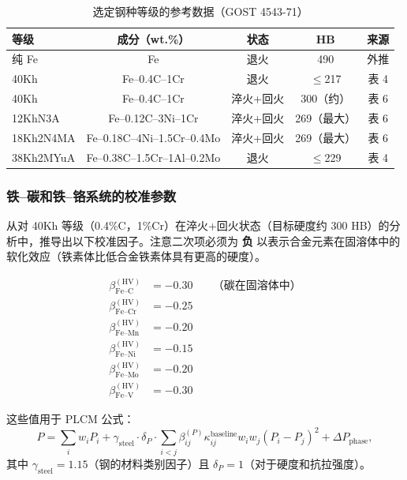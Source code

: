 \documentclass[12pt,a4paper]{article}
\begin{document}
	\begin{table}[htbp]
		\centering
		\caption{选定钢种等级的参考数据（GOST 4543-71）}
		\label{tab:steel_gost4543}
		\begin{tabular}{lcccc}
			\toprule
			\textbf{等级} & \textbf{成分（wt.\%）} & \textbf{状态} & \textbf{HB} & \textbf{来源} \\
			\midrule
			纯 Fe & Fe & 退火 & 490 & 外推 \\
			40Kh & Fe–0.4C–1Cr & 退火 & $\le$217 & 表 4 \\
			40Kh & Fe–0.4C–1Cr & 淬火+回火 & 300（约） & 表 6 \\
			12KhN3A & Fe–0.12C–3Ni–1Cr & 淬火+回火 & 269（最大） & 表 6 \\
			18Kh2N4MA & Fe–0.18C–4Ni–1.5Cr–0.4Mo & 淬火+回火 & 269（最大） & 表 6 \\
			38Kh2MYuA & Fe–0.38C–1.5Cr–1Al–0.2Mo & 退火 & $\le$229 & 表 4 \\
			\bottomrule
		\end{tabular}
	\end{table}
	
	\subsubsection{铁–碳和铁–铬系统的校准参数}
	从对 40Kh 等级（0.4\%C，1\%Cr）在淬火+回火状态（目标硬度约 300 HB）的分析中，推导出以下校准因子。注意二次项必须为 \textbf{负} 以表示合金元素在固溶体中的软化效应（铁素体比低合金铁素体具有更高的硬度）。
	
	\[
	\begin{aligned}
		\beta_{\text{Fe–C}}^{(\text{HV})} &= -0.30 \quad &\text{（碳在固溶体中）} \\
		\beta_{\text{Fe–Cr}}^{(\text{HV})} &= -0.25 \\
		\beta_{\text{Fe–Mn}}^{(\text{HV})} &= -0.20 \\
		\beta_{\text{Fe–Ni}}^{(\text{HV})} &= -0.15 \\
		\beta_{\text{Fe–Mo}}^{(\text{HV})} &= -0.20 \\
		\beta_{\text{Fe–V}}^{(\text{HV})} &= -0.30
	\end{aligned}
	\]
	
	这些值用于 PLCM 公式：
	\[
	P = \sum_i w_i P_i + \gamma_{\text{steel}} \cdot \delta_P \cdot \sum_{i<j} \beta_{ij}^{(P)} \kappa_{ij}^{\text{baseline}} w_i w_j (P_i - P_j)^2 + \Delta P_{\text{phase}},
	\]
	其中 $\gamma_{\text{steel}} = 1.15$（钢的材料类别因子）且 $\delta_P = 1$（对于硬度和抗拉强度）。
	
\end{document}
